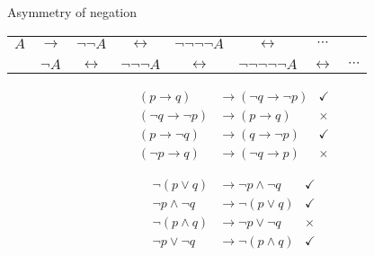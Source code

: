 \documentclass{beamer}
\begin{document}
\begin{frame}{Asymmetry of negation}

\addvspace{\baselineskip}
\begin{tabular}{cccccccc}
    $A$
    & $\to$ & $\lnot\lnot A$
    & $\leftrightarrow$ & $\lnot\lnot\lnot\lnot A$
    & $\leftrightarrow$ & $\dotsb$ \\
    \\
    & $\lnot A$
    & $\leftrightarrow$ & $\lnot\lnot\lnot A$
    & $\leftrightarrow$ & $\lnot\lnot\lnot\lnot\lnot A$
    & $\leftrightarrow$ & $\dotsb$
\end{tabular}

\vfill

\begin{minipage}{.45\textwidth}
\begin{align*}
(p\to q) &\to (\lnot q\to\lnot p) & \checkmark \\
(\lnot q\to\lnot p) &\to (p\to q) & \times \\
(p\to\lnot q) &\to (q\to\lnot p) & \checkmark \\
(\lnot p\to q) &\to (\lnot q\to p) & \times
\end{align*}
\end{minipage}
\hfill
\begin{minipage}{.45\textwidth}
\begin{align*}
\lnot (p\lor q) &\to \lnot p\land \lnot q & \checkmark \\
\lnot p\land \lnot q &\to \lnot (p\lor q) & \checkmark \\
\lnot (p\land q) &\to \lnot p\lor \lnot q & \times \\
\lnot p\lor\lnot q &\to \lnot (p\land q) & \checkmark
\end{align*}
\end{minipage}

\end{frame}
\end{document}
